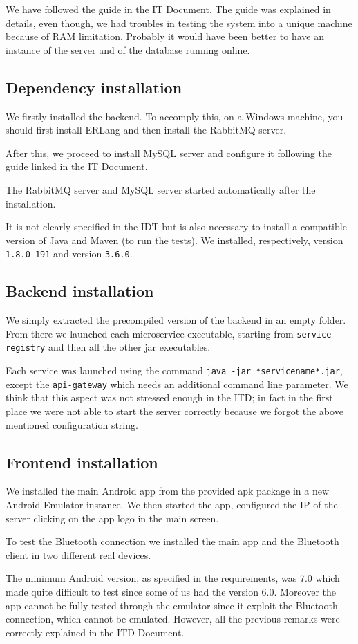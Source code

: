 We have followed the guide in the IT Document.
The guide was explained in details, even though, we had troubles in testing the system into a unique machine because of RAM limitation.
Probably it would have been better to have an instance of the server and of the database running online.


\subsection{Dependency installation}
We firstly installed the backend. To accomply this, on a Windows machine, you should first install ERLang and then install the RabbitMQ server.

After this, we proceed to install MySQL server and configure it following the guide linked in the IT Document.

The RabbitMQ server and MySQL server started automatically after the installation.

It is not clearly specified in the IDT but is also necessary to install a compatible version of Java and Maven (to run the tests). We installed, respectively, version \texttt{1.8.0\_191} and version \texttt{3.6.0}.

\subsection{Backend installation}
We simply extracted the precompiled version of the backend in an empty folder.
From there we launched each microservice executable, starting from \texttt{service-registry} and then all the other jar executables. 

Each service was launched using the command \texttt{java -jar *servicename*.jar}, except the \texttt{api-gateway} which needs an additional command line parameter.
We think that this aspect was not stressed enough in the ITD; in fact in the first place we were not able to start the server correctly because we forgot the above mentioned configuration string.

\subsection{Frontend installation}
We installed the main Android app from the provided apk package in a new Android Emulator instance.
We then started the app, configured the IP of the server clicking on the app logo in the main screen.

To test the Bluetooth connection we installed the main app and the Bluetooth client in two different real devices.

The minimum Android version, as specified in the requirements, was 7.0 which made quite difficult to test since some of us had the version 6.0.
Moreover the app cannot be fully tested through the emulator since it exploit the Bluetooth connection, which cannot be emulated.
However, all the previous remarks were correctly explained in the ITD Document.




